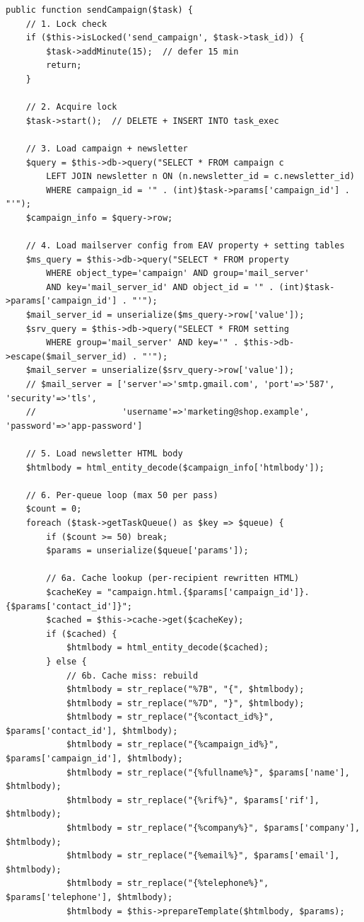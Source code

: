 \documentclass[11pt,a4paper]{article}
\begin{document}
\begin{lstlisting}[caption={\texttt{CronSend::sendCampaign()} --- the campaign sender (abridged).},label={lst:send-campaign}]
public function sendCampaign($task) {
    // 1. Lock check
    if ($this->isLocked('send_campaign', $task->task_id)) {
        $task->addMinute(15);  // defer 15 min
        return;
    }

    // 2. Acquire lock
    $task->start();  // DELETE + INSERT INTO task_exec

    // 3. Load campaign + newsletter
    $query = $this->db->query("SELECT * FROM campaign c
        LEFT JOIN newsletter n ON (n.newsletter_id = c.newsletter_id)
        WHERE campaign_id = '" . (int)$task->params['campaign_id'] . "'");
    $campaign_info = $query->row;

    // 4. Load mailserver config from EAV property + setting tables
    $ms_query = $this->db->query("SELECT * FROM property
        WHERE object_type='campaign' AND group='mail_server'
        AND key='mail_server_id' AND object_id = '" . (int)$task->params['campaign_id'] . "'");
    $mail_server_id = unserialize($ms_query->row['value']);
    $srv_query = $this->db->query("SELECT * FROM setting
        WHERE group='mail_server' AND key='" . $this->db->escape($mail_server_id) . "'");
    $mail_server = unserialize($srv_query->row['value']);
    // $mail_server = ['server'=>'smtp.gmail.com', 'port'=>'587', 'security'=>'tls',
    //                 'username'=>'marketing@shop.example', 'password'=>'app-password']

    // 5. Load newsletter HTML body
    $htmlbody = html_entity_decode($campaign_info['htmlbody']);

    // 6. Per-queue loop (max 50 per pass)
    $count = 0;
    foreach ($task->getTaskQueue() as $key => $queue) {
        if ($count >= 50) break;
        $params = unserialize($queue['params']);

        // 6a. Cache lookup (per-recipient rewritten HTML)
        $cacheKey = "campaign.html.{$params['campaign_id']}.{$params['contact_id']}";
        $cached = $this->cache->get($cacheKey);
        if ($cached) {
            $htmlbody = html_entity_decode($cached);
        } else {
            // 6b. Cache miss: rebuild
            $htmlbody = str_replace("%7B", "{", $htmlbody);
            $htmlbody = str_replace("%7D", "}", $htmlbody);
            $htmlbody = str_replace("{%contact_id%}", $params['contact_id'], $htmlbody);
            $htmlbody = str_replace("{%campaign_id%}", $params['campaign_id'], $htmlbody);
            $htmlbody = str_replace("{%fullname%}", $params['name'], $htmlbody);
            $htmlbody = str_replace("{%rif%}", $params['rif'], $htmlbody);
            $htmlbody = str_replace("{%company%}", $params['company'], $htmlbody);
            $htmlbody = str_replace("{%email%}", $params['email'], $htmlbody);
            $htmlbody = str_replace("{%telephone%}", $params['telephone'], $htmlbody);
            $htmlbody = $this->prepareTemplate($htmlbody, $params);


\end{lstlisting}
\end{document}
